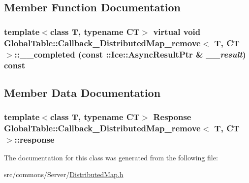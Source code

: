 \subsection{Member Function Documentation}
\hypertarget{class_global_table_1_1_callback___distributed_map__remove_a82443b2a95106769343ee2ea70a94210}{
\subsubsection[{\_\-\_\-completed}]{\setlength{\rightskip}{0pt plus 5cm}template$<$class T, typename CT$>$ virtual void {\bf GlobalTable::Callback\_\-DistributedMap\_\-remove}$<$ T, CT $>$::\_\-\_\-completed (const ::Ice::AsyncResultPtr \& {\em \_\-\_\-result}) const}}
\label{class_global_table_1_1_callback___distributed_map__remove_a82443b2a95106769343ee2ea70a94210}


\subsection{Member Data Documentation}
\hypertarget{class_global_table_1_1_callback___distributed_map__remove_ab200004ef5fb4df6f426fd5bcb418b4b}{
\subsubsection[{response}]{\setlength{\rightskip}{0pt plus 5cm}template$<$class T, typename CT$>$ {\bf Response} {\bf GlobalTable::Callback\_\-DistributedMap\_\-remove}$<$ T, CT $>$::{\bf response}}}
\label{class_global_table_1_1_callback___distributed_map__remove_ab200004ef5fb4df6f426fd5bcb418b4b}


The documentation for this class was generated from the following file:\begin{DoxyCompactItemize}
\item 
src/commons/Server/\hyperlink{_distributed_map_8h}{DistributedMap.h}\end{DoxyCompactItemize}
